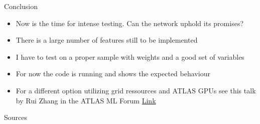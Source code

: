 \documentclass[10pt, UKenglish]{beamer}
\begin{document}
\begin{frame}{Conclusion}
  \begin{itemize}
    \item Now is the time for intense testing. Can the network uphold its promises?
    \vspace{0.2cm}
    \item There is a large number of features still to be implemented
    \vspace{0.2cm}
    \item I have to test on a proper sample with weights and a good set of variables
    \vspace{0.2cm}
    \item For now the code is running and shows the expected behaviour
    \vspace{0.2cm}
    \item For a different option utilizing grid ressources and ATLAS GPUs see this talk by Rui Zhang in the ATLAS ML Forum \href{https://indico.cern.ch/event/932867/contributions/3920181/attachments/2064112/3463583/AML20200725.pdf}{Link}
  \end{itemize}
\end{frame}

\begin{frame}{Sources}

\printbibliography
    
\end{frame}
\end{document}
